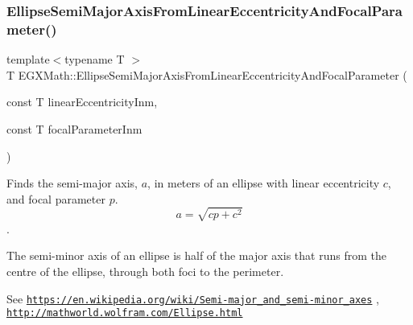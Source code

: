 \mbox{\label{group___e_g_x_math-_geometry-2_d-_ellipse-_semi_major_axis_gad77cbdb5c764cb11bc79a7373d0b6881}} 
\subsubsection{\texorpdfstring{Ellipse\+Semi\+Major\+Axis\+From\+Linear\+Eccentricity\+And\+Focal\+Parameter()}{EllipseSemiMajorAxisFromLinearEccentricityAndFocalParameter()}}
{\footnotesize\ttfamily template$<$typename T $>$ \\
T E\+G\+X\+Math\+::\+Ellipse\+Semi\+Major\+Axis\+From\+Linear\+Eccentricity\+And\+Focal\+Parameter (\begin{DoxyParamCaption}\item[{const T}]{linear\+Eccentricity\+Inm,  }\item[{const T}]{focal\+Parameter\+Inm }\end{DoxyParamCaption})}



Finds the semi-\/major axis, $a$, in meters of an ellipse with linear eccentricity $c$, and focal parameter $p$. \[ a=\sqrt{cp + c^2} \]. 

The semi-\/minor axis of an ellipse is half of the major axis that runs from the centre of the ellipse, through both foci to the perimeter.

See \href{https://en.wikipedia.org/wiki/Semi-major_and_semi-minor_axes}{\tt https\+://en.\+wikipedia.\+org/wiki/\+Semi-\/major\+\_\+and\+\_\+semi-\/minor\+\_\+axes} , \href{http://mathworld.wolfram.com/Ellipse.html}{\tt http\+://mathworld.\+wolfram.\+com/\+Ellipse.\+html}


